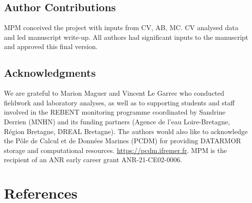 \documentclass[9pt,biorxiv,doublespacing,lineno]{lapreprint}
\begin{document}
\hypertarget{author-contributions}{%
\subsection{Author Contributions}\label{author-contributions}}

MPM conceived the project with inputs from CV, AB, MC. CV analysed data
and led manuscript write-up. All authors had significant inputs to the
manuscript and approved this final version.

\hypertarget{acknowledgments}{%
\subsection{Acknowledgments}\label{acknowledgments}}

We are grateful to Marion Maguer and Vincent Le Garrec who conducted
fieldwork and laboratory analyses, as well as to supporting students and
staff involved in the REBENT monitoring programme coordinated by
Sandrine Derrien (MNHN) and its funding partners (Agence de l'eau
Loire-Bretagne, Région Bretagne, DREAL Bretagne). The authors would also
like to acknowledge the Pôle de Calcul et de Données Marines (PCDM) for
providing DATARMOR storage and computational resources.
\url{https://pcdm.ifremer.fr}. MPM is the recipient of an ANR early
career grant ANR-21-CE02-0006.

\hypertarget{references}{%
\section*{References}\label{references}}
\end{document}
